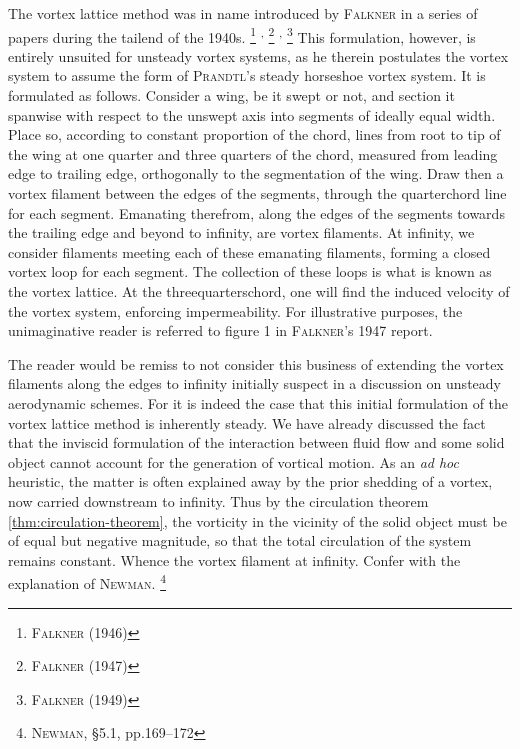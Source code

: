 The vortex lattice method was in name introduced by \textsc{Falkner} in a series of papers during the tailend of the 1940s.%
\footnote{%
        \cite{falkner1946accuracy} \textsc{Falkner} (1946)
}%
\textsuperscript{,}%
\footnote{%
        \cite{falkner1953solution} \textsc{Falkner} (1947)
}%
\textsuperscript{,}%
\footnote{%
        \cite{falkner1952scope} \textsc{Falkner} (1949)
}
%
This formulation, however, is entirely unsuited for unsteady vortex systems, as he therein postulates the vortex system to assume the form of \textsc{Prandtl}'s steady horseshoe vortex system.
It is formulated as follows.
Consider a wing, be it swept or not, and section it spanwise with respect to the unswept axis into segments of ideally equal width.
Place so, according to constant proportion of the chord, lines from root to tip of the wing at one quarter and three quarters of the chord, measured from leading edge to trailing edge, orthogonally to the segmentation of the wing.
Draw then a vortex filament between the edges of the segments, through the quarterchord line for each segment.
Emanating therefrom, along the edges of the segments towards the trailing edge and beyond to infinity, are vortex filaments.
At infinity, we consider filaments meeting each of these emanating filaments, forming a closed vortex loop for each segment.
The collection of these loops is what is known as the vortex lattice.
At the threequarterschord, one will find the induced velocity of the vortex system, enforcing impermeability.
For illustrative purposes, the unimaginative reader is referred to figure 1 in \textsc{Falkner}'s 1947 report.

The reader would be remiss to not consider this business of extending the vortex filaments along the edges to infinity initially suspect in a discussion on unsteady aerodynamic schemes.
For it is indeed the case that this initial formulation of the vortex lattice method is inherently steady.
We have already discussed the fact that the inviscid formulation of the interaction between fluid flow and some solid object cannot account for the generation of vortical motion.
As an \emph{ad hoc} heuristic, the matter is often explained away by the prior shedding of a vortex, now carried downstream to infinity.
Thus by the circulation theorem \ref{thm:circulation-theorem}, the vorticity in the vicinity of the solid object must be of equal but negative magnitude, so that the total circulation of the system remains constant.
Whence the vortex filament at infinity.
Confer with the explanation of \textsc{Newman}.%
\footnote{%
        \cite{newman2017marine} \textsc{Newman}, \S5.1, pp.169--172
}

